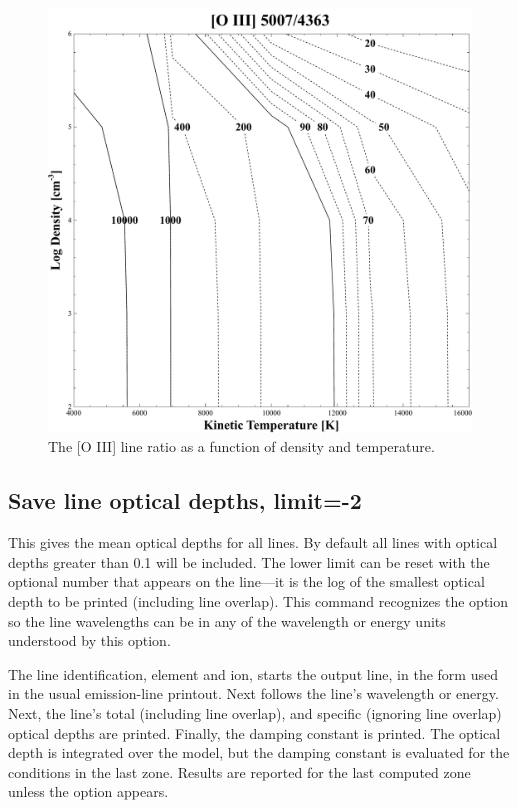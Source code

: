 \begin{figure}
\centering
\includegraphics[scale=0.4]{SaveLineRatio}
\caption[Save line ratio example]{
\label{fig:SaveLineRatio}
The [O III] line ratio as a function of density and temperature.}
\end{figure}

\subsection{Save line optical depths, limit=-2}

This gives the mean optical depths for all lines.  By default all lines
with optical depths greater than 0.1 will be included.  The lower limit
can be reset with the optional number that appears on the line---it is the
log of the smallest optical depth to be printed (including line overlap).
This command recognizes the  option so the line
wavelengths can be in any of the wavelength or energy units
understood by this option.

The line identification, element and ion, starts the output line, in
the form used in the usual emission-line printout.
Next follows the line's wavelength or energy.
Next, the line's total (including line overlap), and
specific (ignoring line overlap) optical depths are printed.
Finally, the damping constant is printed.
The optical depth is integrated over the model,
but the damping constant is evaluated for the
conditions in the last zone.
Results are reported for the last computed zone unless the  option
appears.

